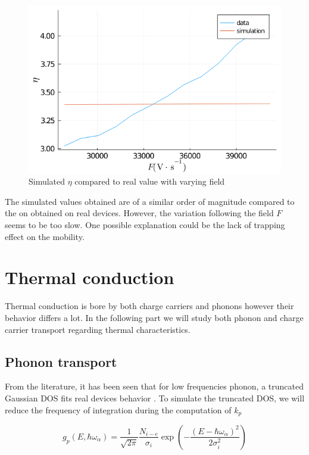 \begin{figure}[!h]
    \centering
    \includegraphics*[width=.5\paperwidth]{figures/4_thermal/xavier_fit.png}
    \caption{Simulated $\eta$ compared to real value with varying field \label{fig:4_9}}
\end{figure}

The simulated values obtained are of a similar order of magnitude compared to the on obtained on real devices. However, the variation following the field $F$ seems to be too slow. One possible explanation could be the lack of trapping effect on the mobility.

\section{Thermal conduction}

Thermal conduction is bore by both charge carriers and phonons however their behavior differs a lot. In the following part we will study both phonon and charge carrier transport regarding thermal characteristics.

\subsection{Phonon transport}

From the literature, it has been seen that for low frequencies phonon, a truncated Gaussian DOS fits real devices behavior \cite{phonon_DOS}. To simulate the truncated DOS, we will reduce the frequency of integration during the computation of $k_p$

\begin{equation}
    g_p\left(E, \hbar \omega_{\alpha}\right)=\frac{1}{\sqrt{2 \pi}}\frac{N_{i-e}}{\sigma_{i}} \exp \left(-\frac{\left(E-\hbar \omega_{\alpha}\right)^{2}}{2 \sigma_{i}^{2}}\right)
    \label{eq:4_1}
\end{equation}

